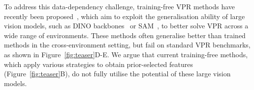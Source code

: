 To address this data-dependency challenge, training-free VPR methods have recently been proposed~\citep{anyloc,effovpr}, which aim to exploit the generalisation ability of large vision models, such as DINO backbones~\citep{dinov2} or SAM~\citep{kirillov2023segment}, to better solve VPR across a wide range of environments. These methods often generalise better than trained methods in the cross-environment setting, but fail on standard VPR benchmarks, as shown in Figure~\ref{fig:teaser}D-E. We argue that current training-free methods, which apply various strategies to obtain prior-selected features (Figure~\ref{fig:teaser}B), do not fully utilise the potential of these large vision models.

